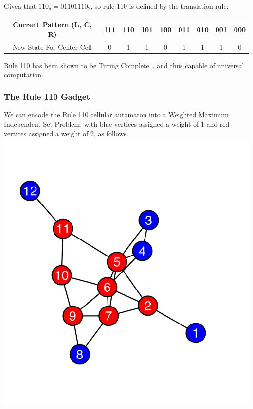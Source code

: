\documentclass[twocolumn,superscriptaddress,english,showpacs,longbibliography]{revtex4-2}
\begin{document}
Given that $110_d = 01101110_2$, so rule 110 is defined by the
translation rule:

\begin{tabular}{|c|c|c|c|c|c|c|c|c|}
\hline
Current Pattern (L, C, R) & 111 & 110 & 101 & 100 & 011 & 010 & 001 & 000 \\
\hline
New State For Center Cell & 0 & 1 & 1 & 0 & 1 & 1 & 1 & 0 \\
\hline
\end{tabular}

Rule 110 has been shown to be Turing Complete~\cite{Cook2009}, and thus capable of universal
computation.

\subsubsection{The Rule 110 Gadget}\label{the-rule-110-gadget}

We can encode the Rule 110 cellular automaton into a Weighted Maximum
Independent Set Problem, with blue vertices assigned a weight of 1 and
red vertices assigned a weight of 2, as follows.
\includegraphics[width=\columnwidth]{../notes/images/image.png}
\end{document}
